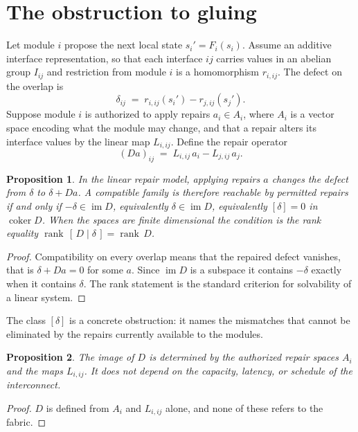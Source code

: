 \documentclass[11pt,openany]{book}
\newtheorem{proposition}{Proposition}[chapter]
\theoremstyle{remark}
\begin{document}
\section{The obstruction to gluing}

Let module $i$ propose the next local state $s_i'=F_i(s_i)$. Assume an additive interface representation, so that each interface $ij$ carries values in an abelian group $I_{ij}$ and restriction from module $i$ is a homomorphism $r_{i,ij}$. The defect on the overlap is
\[
\delta_{ij}\;=\;r_{i,ij}(s_i')-r_{j,ij}(s_j').
\]
Suppose module $i$ is authorized to apply repairs $a_i\in A_i$, where $A_i$ is a vector space encoding what the module may change, and that a repair alters its interface values by the linear map $L_{i,ij}$. Define the repair operator
\[
(Da)_{ij}\;=\;L_{i,ij}\,a_i-L_{j,ij}\,a_j.
\]

\begin{proposition}\label{prop:obstruction}
In the linear repair model, applying repairs $a$ changes the defect from $\delta$ to $\delta+Da$. A compatible family is therefore reachable by permitted repairs if and only if $-\delta\in\operatorname{im}D$, equivalently $\delta\in\operatorname{im}D$, equivalently $[\delta]=0$ in $\operatorname{coker}D$. When the spaces are finite dimensional the condition is the rank equality $\operatorname{rank}\,[\,D\mid\delta\,]=\operatorname{rank}\,D$.
\end{proposition}
\begin{proof}
Compatibility on every overlap means that the repaired defect vanishes, that is $\delta+Da=0$ for some $a$. Since $\operatorname{im}D$ is a subspace it contains $-\delta$ exactly when it contains $\delta$. The rank statement is the standard criterion for solvability of a linear system.
\end{proof}

The class $[\delta]$ is a concrete obstruction: it names the mismatches that cannot be eliminated by the repairs currently available to the modules.

\begin{proposition}\label{prop:nobandwidth}
The image of $D$ is determined by the authorized repair spaces $A_i$ and the maps $L_{i,ij}$. It does not depend on the capacity, latency, or schedule of the interconnect.
\end{proposition}
\begin{proof}
$D$ is defined from $A_i$ and $L_{i,ij}$ alone, and none of these refers to the fabric.
\end{proof}
\end{document}
